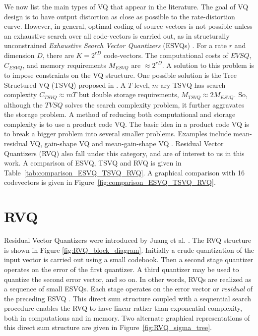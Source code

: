 We now list the main types of VQ that appear in the literature.  The goal of VQ design is to have output distortion as close as possible to the rate-distortion curve.  However, in general, optimal coding of source vectors is not possible unless an exhaustive search over all code-vectors is carried out, as in structurally unconstrained \emph{Exhaustive Search Vector Quantizers} (ESVQs) \cite{1992_JNL_RVQ_Barnes}.  For a rate $r$ and dimension $D$, there are $K=2^{rD}$ code-vectors.  The computational costs of $EVSQ$, $C_{ESVQ}$, and memory requirements $M_{ESVQ}$ are $\approx 2^{rD}$.  A solution to this problem is to impose constraints on the VQ structure.  One possible solution is the Tree Structured VQ (TSVQ) proposed in \cite{1980_JNL_TSVQ_Buzo}.  A $T$-level, $m$-ary TSVQ has search complexity $C_{TSVQ} \approx mT$ but double storage requirements, $M_{TSVQ} \approx 2 M_{ESVQ}$.   So, although the $TVSQ$ solves the search complexity problem, it further aggravates the storage problem.  A method of reducing both computational and storage complexity is to use a product code VQ.  The basic idea in a product code VQ is to break a bigger problem into several smaller problems.  Examples include mean-residual VQ, gain-shape VQ and mean-gain-shape VQ \cite{1996_JNL_AdvancesRVQ_Barnes}.  Residual Vector Quantizers (RVQ) also fall under this category, and are of interest to us in this work.  A comparison of ESVQ, TSVQ and RVQ is given in Table~\ref{tab:comparison_ESVQ_TSVQ_RVQ}.  A graphical comparison with 16 codevectors is given in Figure~\ref{fig:comparison_ESVQ_TSVQ_RVQ}.

\section{RVQ}
Residual Vector Quantizers were introduced by Juang et al. \cite{1982_CNF_SpeechRVQ_JuangGray}.  The RVQ structure is shown in Figure \ref{fig:RVQ_block_diagram}.  Initially a crude quantization of the input vector is carried out using a small codebook.  Then a second stage quantizer operates on the error of the first quantizer.  A third quantizer may be used to quantize the second error vector, and so on.  In other words, RVQs are realized as a sequence of small ESVQs.  Each stage operates on the error vector or \emph{residual} of the preceding ESVQ \cite{1991_CNF_DesignPerformanceRVQ_Frost}.  This direct sum structure coupled with a sequential search procedure enables the RVQ to have linear rather than exponential complexity, both in computations and in memory.  Two alternate graphical representations of this direct sum structure are given in Figure~\ref{fig:RVQ_sigma_tree}.

